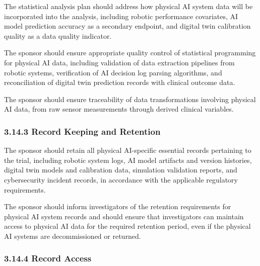 \documentclass[11pt]{article}
\begin{document}
\begin{description}[leftmargin=2.5cm,style=sameline]

\item[(a)] The statistical analysis plan should address how physical AI system data will be incorporated into the analysis, including robotic performance covariates, AI model prediction accuracy as a secondary endpoint, and digital twin calibration quality as a data quality indicator.

\item[(b)] The sponsor should ensure appropriate quality control of statistical programming for physical AI data, including validation of data extraction pipelines from robotic systems, verification of AI decision log parsing algorithms, and reconciliation of digital twin prediction records with clinical outcome data.

\item[(c)] The sponsor should ensure traceability of data transformations involving physical AI data, from raw sensor measurements through derived clinical variables.

\end{description}

\subsubsection{3.14.3 Record Keeping and Retention}

\begin{description}[leftmargin=2.5cm,style=sameline]

\item[(a)] The sponsor should retain all physical AI-specific essential records pertaining to the trial, including robotic system logs, AI model artifacts and version histories, digital twin models and calibration data, simulation validation reports, and cybersecurity incident records, in accordance with the applicable regulatory requirements.

\item[(b)] The sponsor should inform investigators of the retention requirements for physical AI system records and should ensure that investigators can maintain access to physical AI data for the required retention period, even if the physical AI systems are decommissioned or returned.

\end{description}

\subsubsection{3.14.4 Record Access}
\end{document}

